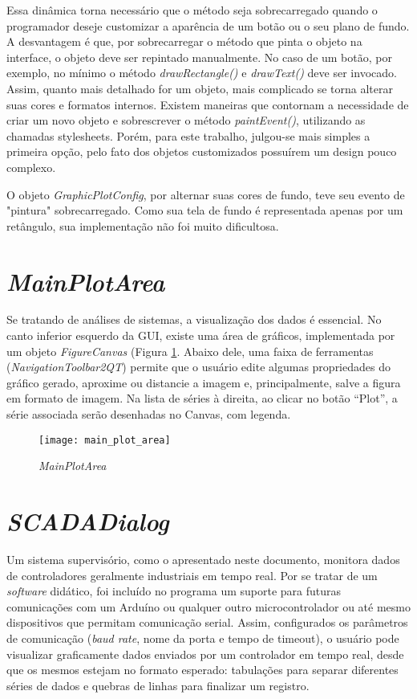 Essa dinâmica torna necessário que o método seja sobrecarregado quando o programador deseje customizar a aparência de um botão ou o seu plano de fundo. A desvantagem é que, por sobrecarregar o método que pinta o objeto na interface, o objeto deve ser repintado manualmente. No caso de um botão, por exemplo, no mínimo o método \emph{drawRectangle()} e \emph{drawText()} deve ser invocado. Assim, quanto mais detalhado for um objeto, mais complicado se torna alterar suas cores e formatos internos. Existem maneiras que contornam a necessidade de criar um novo objeto e sobrescrever o método \emph{paintEvent()}, utilizando as chamadas stylesheets. Porém, para este trabalho, julgou-se mais simples a primeira opção, pelo fato dos objetos customizados possuírem um design pouco complexo.

O objeto \emph{GraphicPlotConfig}, por alternar suas cores de fundo, teve seu evento de "pintura" sobrecarregado. Como sua tela de fundo é representada apenas por um retângulo, sua implementação não foi muito dificultosa.

\section{\emph{MainPlotArea}}

Se tratando de análises de sistemas, a visualização dos dados é essencial. No canto inferior esquerdo da GUI, existe uma área de gráficos, implementada por um objeto \emph{FigureCanvas} (Figura \ref{img_main_plot_area}. Abaixo dele, uma faixa de ferramentas (\emph{NavigationToolbar2QT}) permite que o usuário edite algumas propriedades do gráfico gerado, aproxime ou distancie a imagem e, principalmente, salve a figura em formato de imagem. Na lista de séries à direita, ao clicar no botão “Plot”, a série associada serão desenhadas no Canvas, com legenda.

\begin{figure}[htb]
	\centering
	\caption{\emph{MainPlotArea}}
	\texttt{[image: main\_plot\_area]}
	\label{img_main_plot_area}
\end{figure}

\section{\emph{SCADADialog}}

Um sistema supervisório, como o apresentado neste documento, monitora dados de controladores geralmente industriais em tempo real. Por se tratar de um \emph{software} didático, foi incluído no programa um suporte para futuras comunicações com um Arduíno ou qualquer outro microcontrolador ou até mesmo dispositivos que permitam comunicação serial. Assim, configurados os parâmetros de comunicação (\emph{baud rate}, nome da porta e tempo de timeout), o usuário pode visualizar graficamente dados enviados por um controlador em tempo real, desde que os mesmos estejam no formato esperado: tabulações para separar diferentes séries de dados e quebras de linhas para finalizar um registro.

